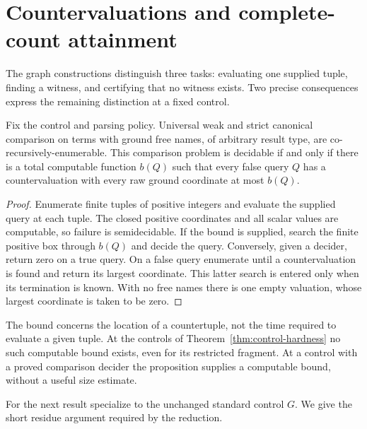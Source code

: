 \section{Countervaluations and complete-count attainment}
\label{sec:boundaries}

The graph constructions distinguish three tasks: evaluating one supplied
tuple, finding a witness, and certifying that no witness exists. Two
precise consequences express the remaining distinction at a fixed control.

\begin{proposition}
\label{prop:counter-bound}
Fix the control and parsing policy. Universal weak and strict canonical
comparison on terms with ground free names, of arbitrary result type,
are co-recursively-enumerable. This comparison problem is decidable if
and only if there is a total computable function $b(Q)$ such that
every false query $Q$ has a countervaluation with every raw ground
coordinate at most $b(Q)$.
\end{proposition}
\begin{proof}
Enumerate finite tuples of positive integers and evaluate the supplied
query at each tuple. The closed positive coordinates and all scalar
values are computable, so failure is semidecidable. If the bound is
supplied, search the finite positive box through $b(Q)$ and decide the
query. Conversely, given a decider, return zero on a true query. On a
false query enumerate until a countervaluation is found and return its
largest coordinate. This latter search is entered only when its
termination is known. With no free names there is one empty valuation,
whose largest coordinate is taken to be zero.
\end{proof}

The bound concerns the location of a countertuple, not the time required
to evaluate a given tuple. At the controls of
Theorem~\ref{thm:control-hardness} no such computable bound exists,
even for its restricted fragment. At a control with a proved comparison
decider the proposition supplies a computable bound, without a useful
size estimate.

For the next result specialize to the unchanged standard control $G$.
We give the short residue argument required by the reduction.

